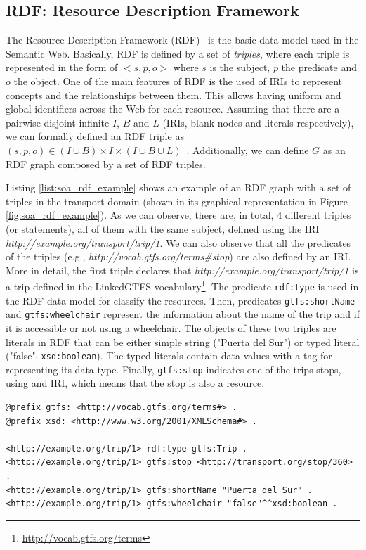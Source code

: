 \subsection{RDF: Resource Description Framework}
The Resource Description Framework (RDF)~\citep{RDF} is the basic data model used in the Semantic Web. Basically, RDF is defined by a set of \textit{triples}, where each triple is represented in the form of $<s,p,o>$ where $s$ is the subject, $p$ the predicate and $o$ the object. One of the main features of RDF is the used of IRIs to represent concepts and the relationships between them. This allows having uniform and global identifiers across the Web for each resource. Assuming that there are a pairwise disjoint infinite $I$, $B$ and $L$ (IRIs, blank nodes and literals respectively), we can formally defined an RDF triple as $(s,p,o) \in (I \cup B) \times I \times (I \cup B \cup L)$~\citep{perez2009semantics}. Additionally, we can define $G$ as an RDF graph composed by a set of RDF triples.

Listing \ref{list:soa_rdf_example} shows an example of an RDF graph with a set of triples in the transport domain (shown in its graphical representation in Figure \ref{fig:soa_rdf_example}). As we can observe, there are, in total, 4 different triples (or statements), all of them with the same subject, defined using the IRI \textit{http://example.org/transport/trip/1}. We can also observe that all the predicates of the triples (e.g., \textit{http://vocab.gtfs.org/terms\#stop}) are also defined by an IRI. More in detail, the first triple declares that \textit{http://example.org/transport/trip/1} is a trip defined in the LinkedGTFS vocabulary\footnote{\url{http://vocab.gtfs.org/terms}}. The predicate \texttt{rdf:type} is used in the RDF data model for classify the resources. Then, predicates \texttt{gtfs:shortName} and \texttt{gtfs:wheelchair} represent the information about the name of the trip and if it is accessible or not using a wheelchair. The objects of these two triples are literals in RDF that can be either simple string ("Puerta del Sur") or typed literal ("false"$\hat{\;}\hat{\;}$\texttt{xsd:boolean}). The typed literals contain data values with a tag for representing its data type. Finally, \texttt{gtfs:stop} indicates one of the trips stops, using and IRI, which means that the stop is also a resource. 


\begin{lstlisting}[float,caption=Example of RDF graph,frame=tlrb,label={list:soa_rdf_example}, columns=fullflexible]
@prefix gtfs: <http://vocab.gtfs.org/terms#> .
@prefix xsd: <http://www.w3.org/2001/XMLSchema#> .

<http://example.org/trip/1> rdf:type gtfs:Trip .
<http://example.org/trip/1> gtfs:stop <http://transport.org/stop/360> .
<http://example.org/trip/1> gtfs:shortName "Puerta del Sur" .
<http://example.org/trip/1> gtfs:wheelchair "false"^^xsd:boolean .
\end{lstlisting}

